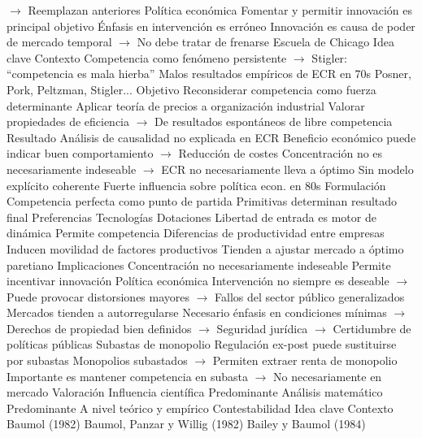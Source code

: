 \documentclass{nuevotema}
\begin{document}
\begin{esquemal}
				\4[] $\to$ Reemplazan anteriores
				\4 Política económica
				\4[] Fomentar y permitir innovación es principal objetivo
				\4[] Énfasis en intervención es erróneo
				\4[] Innovación es causa de poder de mercado temporal
				\4[] $\to$ No debe tratar de frenarse
		\2 Escuela de Chicago
			\3 Idea clave
				\4 Contexto
				\4[] Competencia como fenómeno persistente
				\4[] $\to$ Stigler: ``competencia es mala hierba''
				\4[] Malos resultados empíricos de ECR en 70s
				\4[] Posner, Pork, Peltzman, Stigler...
				\4 Objetivo
				\4[] Reconsiderar competencia como fuerza determinante
				\4[] Aplicar teoría de precios a organización industrial
				\4[] Valorar propiedades de eficiencia
				\4[] $\to$ De resultados espontáneos de libre competencia
				\4 Resultado
				\4[] Análisis de causalidad no explicada en ECR
				\4[] Beneficio económico puede indicar buen comportamiento
				\4[] $\to$ Reducción de costes
				\4[] Concentración no es necesariamente indeseable
				\4[] $\to$ ECR no necesariamente lleva a óptimo
				\4[] Sin modelo explícito coherente
				\4[] Fuerte influencia sobre política econ. en 80s
			\3 Formulación
				\4 Competencia perfecta como punto de partida
				\4 Primitivas determinan resultado final
				\4[] Preferencias
				\4[] Tecnologías
				\4[] Dotaciones
				\4 Libertad de entrada es motor de dinámica
				\4[] Permite competencia
				\4 Diferencias de productividad entre empresas
				\4[] Inducen movilidad de factores productivos
				\4[] Tienden a ajustar mercado a óptimo paretiano
			\3 Implicaciones
				\4 Concentración no necesariamente indeseable
				\4[] Permite incentivar innovación
				\4 Política económica
				\4[] Intervención no siempre es deseable
				\4[] $\to$ Puede provocar distorsiones mayores
				\4[] $\to$ Fallos del sector público generalizados
				\4[] Mercados tienden a autorregularse
				\4[] Necesario énfasis en condiciones mínimas
				\4[] $\to$ Derechos de propiedad bien definidos
				\4[] $\to$ Seguridad jurídica
				\4[] $\to$ Certidumbre de políticas públicas
				\4 Subastas de monopolio
				\4[] Regulación ex-post puede sustituirse por subastas
				\4[] Monopolios subastados
				\4[] $\to$ Permiten extraer renta de monopolio
				\4[] Importante es mantener competencia en subasta
				\4[] $\to$ No necesariamente en mercado
			\3 Valoración
				\4 Influencia científica
				\4[] Predominante
				\4 Análisis matemático
				\4[] Predominante
				\4[] A nivel teórico y empírico
		\2 Contestabilidad
			\3 Idea clave
				\4 Contexto
				\4[] Baumol (1982)
				\4[] Baumol, Panzar y Willig (1982)
				\4[] Bailey y Baumol (1984)

\end{esquemal}
\end{document}
